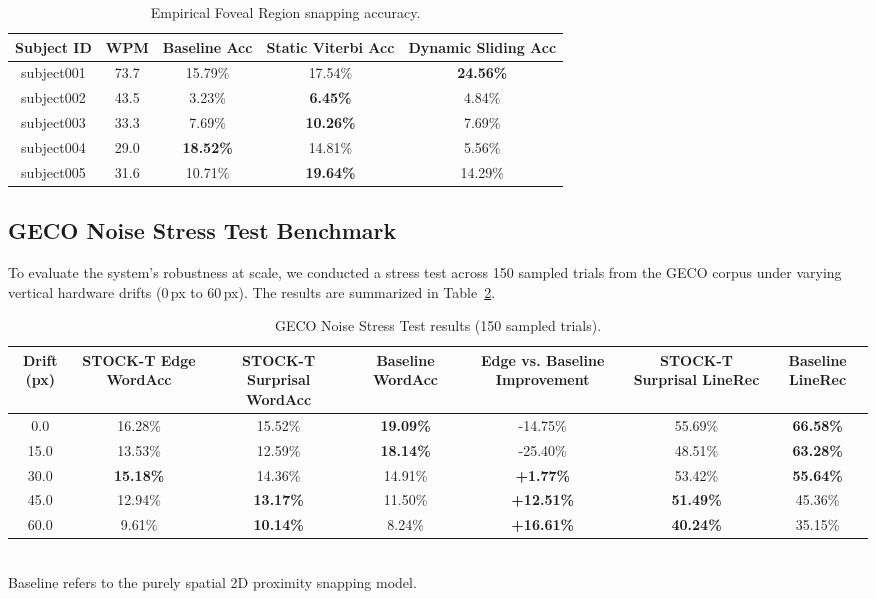 \documentclass[sigconf]{acmart}
\begin{document}
\begin{table}[h]
\centering
\caption{Empirical Foveal Region snapping accuracy.}
\label{tab:empirical_results}
\begin{tabular}{ccccc}
\toprule
Subject ID & WPM & Baseline Acc & Static Viterbi Acc & Dynamic Sliding Acc \\
\midrule
subject001 & 73.7 & 15.79\% & 17.54\% & \textbf{24.56\%} \\
subject002 & 43.5 & 3.23\%  & \textbf{6.45\%}  & 4.84\% \\
subject003 & 33.3 & 7.69\%  & \textbf{10.26\%} & 7.69\% \\
subject004 & 29.0 & \textbf{18.52\%} & 14.81\% & 5.56\% \\
subject005 & 31.6 & 10.71\% & \textbf{19.64\%} & 14.29\% \\
\bottomrule
\end{tabular}
\end{table}

\subsection{GECO Noise Stress Test Benchmark}
To evaluate the system's robustness at scale, we conducted a stress test across 150 sampled trials from the GECO corpus under varying vertical hardware drifts ($0$\,px to $60$\,px). The results are summarized in Table~\ref{tab:noise_stress}.

\begin{table}[t]
\centering
\caption{GECO Noise Stress Test results (150 sampled trials).}
\label{tab:noise_stress}
\begin{tabular}{ccccccc}
\toprule
Drift (px) & STOCK-T Edge WordAcc & STOCK-T Surprisal WordAcc & Baseline WordAcc & Edge vs. Baseline Improvement & STOCK-T Surprisal LineRec & Baseline LineRec \\
\midrule
0.0  & 16.28\% & 15.52\% & \textbf{19.09\%} & -14.75\% & 55.69\% & \textbf{66.58\%} \\
15.0 & 13.53\% & 12.59\% & \textbf{18.14\%} & -25.40\% & 48.51\% & \textbf{63.28\%} \\
30.0 & \textbf{15.18\%} & 14.36\% & 14.91\% & \textbf{+1.77\%} & 53.42\% & \textbf{55.64\%} \\
45.0 & 12.94\% & \textbf{13.17\%} & 11.50\% & \textbf{+12.51\%} & \textbf{51.49\%} & 45.36\% \\
60.0 & 9.61\%  & \textbf{10.14\%} & 8.24\%  & \textbf{+16.61\%} & \textbf{40.24\%} & 35.15\% \\
\bottomrule
\end{tabular}
\\ \small{Baseline refers to the purely spatial 2D proximity snapping model.}
\end{table}
\end{document}
